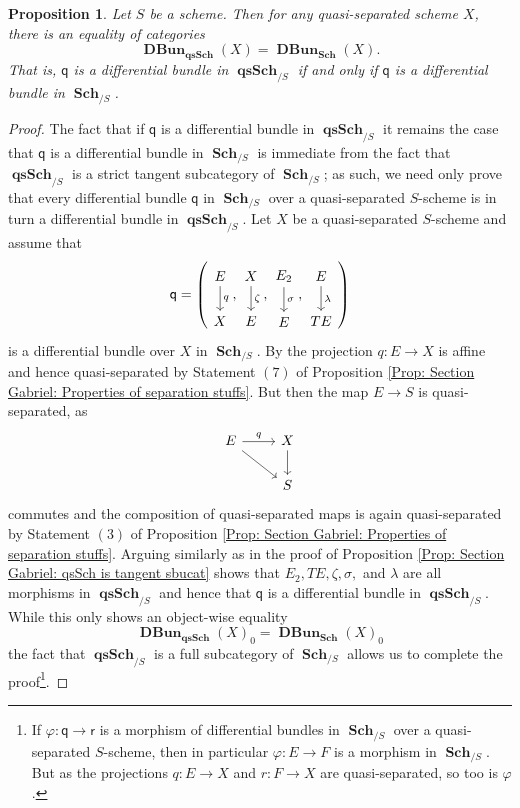 \documentclass{amsart}
\newtheorem{proposition}[equation]{Proposition}
\theoremstyle{definition}
\DeclareMathOperator{\qsSch}{\mathbf{qsSch}}
\DeclareMathOperator{\Sch}{\mathbf{Sch}}
\DeclareMathOperator{\DBun}{\mathbf{DBun}}
\numberwithin{equation}{subsection}
\begin{document}
\begin{proposition}\label{Prop: Section Gabriel: DBun in qs is Dbun in sch}
Let $S$ be a scheme. Then for any quasi-separated scheme $X$, there is an equality of categories
\[
\DBun_{\qsSch}(X) = \DBun_{\Sch}(X).
\]
That is, $\mathsf{q}$ is a differential bundle in $\qsSch_{/S}$ if and only if $\mathsf{q}$ is a differential bundle in $\Sch_{/S}$.
\end{proposition}
\begin{proof}
The fact that if $\mathsf{q}$ is a differential bundle in $\qsSch_{/S}$ it remains the case that $\mathsf{q}$ is a differential bundle in $\Sch_{/S}$ is immediate from the fact that $\qsSch_{/S}$ is a strict tangent subcategory of $\Sch_{/S}$; as such, we need only prove that every differential bundle $\mathsf{q}$ in $\Sch_{/S}$ over a quasi-separated $S$-scheme is in turn a differential bundle in $\qsSch_{/S}$. Let $X$ be a quasi-separated $S$-scheme and assume that
\[
\mathsf{q} = \left(\begin{tikzcd}
	E \ar[d]{}{q} \\ X
\end{tikzcd}, \begin{tikzcd}
X \ar[d]{}{\zeta} \\
E
\end{tikzcd},
\begin{tikzcd}
E_2 \ar[d]{}{\sigma} \\
E
\end{tikzcd},
\begin{tikzcd}
E \ar[d]{}{\lambda} \\
TE
\end{tikzcd}\right)
\]
is a differential bundle over $X$ in $\Sch_{/S}$. By \cite[Proposition 4.25]{GeoffJSDiffBunComAlg} the projection $q:E \to X$ is affine and hence quasi-separated by Statement $(7)$ of Proposition \ref{Prop: Section Gabriel: Properties of separation stuffs}. But then the map $E \to S$ is quasi-separated, as
\[
\begin{tikzcd}
E \ar[r]{}{q} \ar[dr] & X \ar[d]{}{} \\
 & S
\end{tikzcd}
\]
commutes and the composition of quasi-separated maps is again quasi-separated by Statement $(3)$ of Proposition \ref{Prop: Section Gabriel: Properties of separation stuffs}. Arguing similarly as in the proof of Proposition \ref{Prop: Section Gabriel: qsSch is tangent sbucat} shows that $E_2, TE, \zeta, \sigma,$ and $\lambda$ are all morphisms in $\qsSch_{/S}$ and hence that $\mathsf{q}$ is a differential bundle in $\qsSch_{/S}$. While this only shows an object-wise equality
\[
\DBun_{\qsSch}(X)_0 = \DBun_{\Sch}(X)_0
\]
the fact that $\qsSch_{/S}$ is a full subcategory of $\Sch_{/S}$ allows us to complete the proof\footnote{If $\varphi:\mathsf{q} \to \mathsf{r}$ is a morphism of differential bundles in $\Sch_{/S}$ over a quasi-separated $S$-scheme, then in particular $\varphi:E \to F$ is a morphism in $\Sch_{/S}$. But as the projections $q:E \to X$ and $r:F \to X$ are quasi-separated, so too is $\varphi$.}.
\end{proof}
\end{document}
